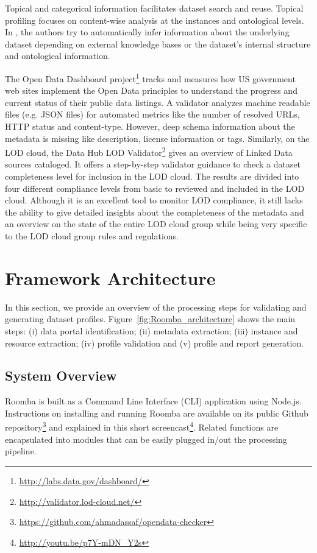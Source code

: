 \documentclass{../../Util/LaTEX/sig-alternate}
\begin{document}
Topical and categorical information facilitates dataset search and reuse. Topical profiling focuses on content-wise analysis at the instances and ontological levels. In \cite{6690016,Bohm:2012:LTG:2396761.2398718,scalableApproach}, the authors try to automatically infer information about the underlying dataset depending on external knowledge bases or the dataset's internal structure and ontological information.

The Open Data Dashboard project\footnote{\url{http://labs.data.gov/dashboard/}} tracks and measures how US government web sites implement the Open Data principles to understand the progress and current status of their public data listings. A validator analyzes machine readable files (e.g. JSON files) for automated metrics like the number of resolved URLs, HTTP status and content-type. However, deep schema information about the metadata is missing like description, license information or tags. Similarly, on the LOD cloud, the Data Hub LOD Validator\footnote{\url{http://validator.lod-cloud.net/}} gives an overview of Linked Data sources cataloged. It offers a step-by-step validator guidance to check a dataset completeness level for inclusion in the LOD cloud. The results are divided into four different compliance levels from basic to reviewed and included in the LOD cloud. Although it is an excellent tool to monitor LOD compliance, it still lacks the ability to give detailed insights about the completeness of the metadata and an overview on the state of the entire LOD cloud group while being very specific to the LOD cloud group rules and regulations.


\section{Framework Architecture}
\label{sec:framework}
In this section, we provide an overview of the processing steps for validating and generating dataset profiles. Figure~\ref{fig:Roomba_architecture} shows the main steps: (i) data portal identification; (ii) metadata extraction; (iii) instance and resource extraction; (iv) profile validation and (v) profile and report generation.

\subsection{System Overview}
Roomba is built as a Command Line Interface (CLI) application using Node.js. Instructions on installing and running Roomba are available on its public Github repository\footnote{\url{https://github.com/ahmadassaf/opendata-checker}} and explained in this short screencast\footnote{\url{http://youtu.be/p7Y-mDN_Y2s}}. Related functions are encapsulated into modules that can be easily plugged in/out the processing pipeline.
\end{document}
